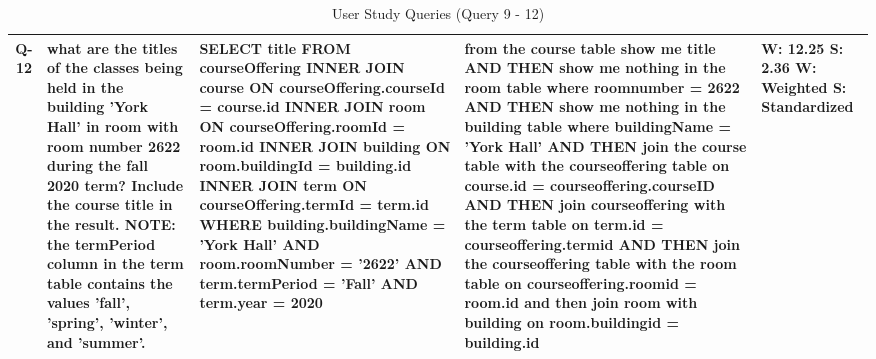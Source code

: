 {\begin{table*}
\begin{tabular}{|c|p{3cm}|p{5.5cm}|p{5.5cm}|p{2cm}|}
        \hline
        Q-12 & what are the titles of the classes being held in the building 'York Hall' in room with room number 2622 during the fall 2020 term? Include the course title in the result. NOTE: the termPeriod column in the term table contains the values 'fall', 'spring', 'winter', and 'summer'. & SELECT title FROM courseOffering INNER JOIN course ON courseOffering.courseId = course.id INNER JOIN room ON courseOffering.roomId = room.id INNER JOIN building ON room.buildingId = building.id INNER JOIN term ON courseOffering.termId = term.id WHERE building.buildingName = 'York Hall' AND room.roomNumber = '2622' AND term.termPeriod = 'Fall' AND term.year = 2020 & from the course table show me title AND THEN show me nothing in the room table where roomnumber = 2622 AND THEN show me nothing in the building table where buildingName = 'York Hall' AND THEN join the course table with the courseoffering table on course.id = courseoffering.courseID AND THEN join courseoffering with the term table on term.id = courseoffering.termid AND THEN join the courseoffering table with the room table on courseoffering.roomid = room.id and then join room with building on room.buildingid = building.id & W: 12.25 \newline S: 2.36 \newline \newline W: Weighted \newline S: Standardized\\
        \hline
        \end{tabular}
        \caption{User Study Queries (Query 9 - 12)}
        \label{tab:queries2}
    \end{table*}
}
\newcommand{\pvalues} {
    \begin{table}[H]
        \begin{tabular}{| p{1in} | c | p{.5in} | p{.5in} |}
          \hline
              & \textbf{P Val} & \textbf{SQL Median} &\textbf{SpeakQL Median} \\
          \hline
          First Planning Time - Simple & 0.144 & 31.5 & 38.5 \\
          \hline
          First Planning Time - Complex & 0.295 & 72.0 & 66.0 \\
          \hline
          Recording Time - Simple & 0.214 & 13.5 & 15.5 \\
          \hline
          Recording Time - Complex & 0.122 & 32.0 & 34.0 \\
          \hline
          Total Time - Simple & 0.222 & 55.5 & 55.8 \\
          \hline
          Total Time - Complex & 0.336 & 137 & 131 \\
          \hline
        \end{tabular}
        \caption{Mann Whitney U Test Results for Simple and Complex Queries}
        \label{tab:mwuresults}
    \end{table}
}
